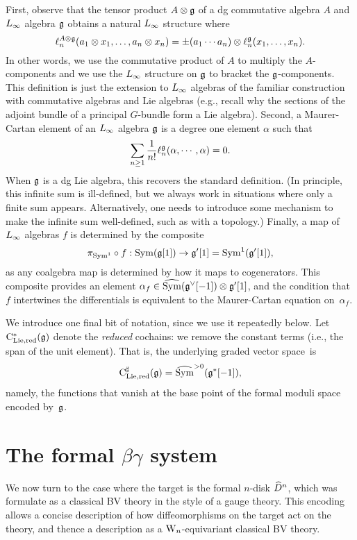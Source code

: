 First, observe that the tensor product $A \otimes \mathfrak g$ of a dg commutative algebra $A$ 
and $\L8$ algebra $\mathfrak g$ obtains a natural $\L8$ structure where
\[
\ell_n^{A \otimes \mathfrak g}(a_1 \otimes x_1, \ldots, a_n \otimes x_n) = \pm (a_1 \cdots a_n) \otimes \ell_n^{\mathfrak g}(x_1,\ldots,x_n).
\]
In other words, we use the commutative product of $A$ to multiply the $A$-components 
and we use the $\L8$ structure on $\mathfrak g$ to bracket the $\mathfrak g$-components.
This definition is just the extension to $\L8$ algebras of the familiar construction 
with commutative algebras and Lie algebras 
(e.g., recall why the sections of the adjoint bundle of a principal $G$-bundle form a Lie algebra).
Second, a Maurer-Cartan element of an $\L8$ algebra $\mathfrak g$ is a degree one element $\alpha$ such that
\[
\sum_{n \geq 1} \frac{1}{n!} \ell^{\mathfrak g}_n(\alpha, \cdots,\alpha) = 0.
\]
When $\mathfrak g$ is a dg Lie algebra, this recovers the standard definition.
(In principle, this infinite sum is ill-defined, but we always work in situations where only a finite sum appears.
Alternatively, one needs to introduce some mechanism to make the infinite sum well-defined, such as with a topology.)
Finally, a map of $\L8$ algebras $f$ is determined by the composite 
\[
\pi_{{\rm Sym}^1} \circ f: {\rm Sym}(\mathfrak g[1]) \to \mathfrak g'[1] = {\rm Sym}^1(\mathfrak g'[1]),
\]
as any coalgebra map is determined by how it maps to cogenerators.
This composite provides an element $\alpha_f \in \widehat{{\rm Sym}}(\mathfrak g^\vee[-1]) \otimes \mathfrak g'[1]$,
and the condition that $f$ intertwines the differentials is equivalent 
to the Maurer-Cartan equation on~$\alpha_f$.

We introduce one final bit of notation, since we use it repeatedly below.
Let ${\rm C}^*_{\rm Lie, red}(\mathfrak g)$ denote the {\em reduced} cochains:
we remove the constant terms (i.e., the span of the unit element).
That is, the underlying graded vector space~is
\[
{\rm C}^\sharp_{\rm Lie,red}(\mathfrak g) = \widehat{{\rm Sym}}^{>0}(\mathfrak g^*[-1]),
\]
namely, the functions that vanish at the base point of the formal moduli space encoded by~$\mathfrak g$.

\section{The formal $\beta\gamma$ system}
\label{sec formal}

We now turn to the case where the target is the formal $n$-disk $\widehat{D}^n$,
which was formulate as a classical BV theory in the style of a gauge theory.
This encoding allows a concise description of how diffeomorphisms on the target act on the theory,
and thence a description as a ${{\rm W}_n}$-equivariant classical BV theory.

